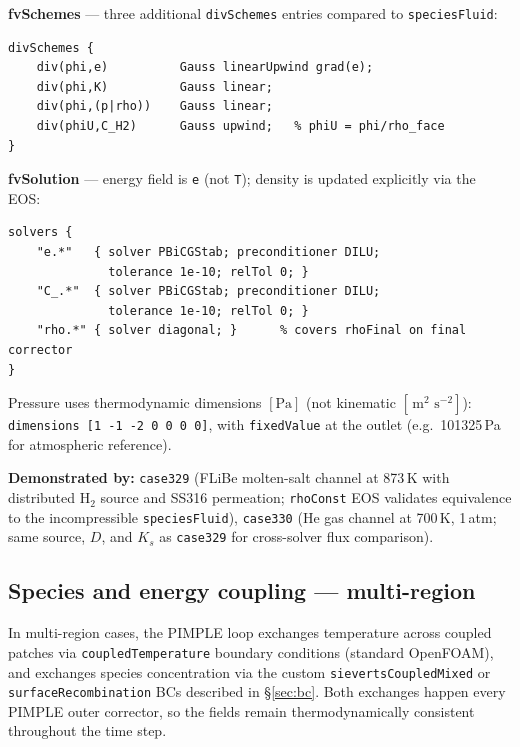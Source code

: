 \documentclass[11pt,a4paper]{article}
\newcommand{\m}{\,\text{m}}
\newcommand{\s}{\,\text{s}}
\newcommand{\caseref}[1]{\texttt{\color{casegreen}#1}}
\newcommand{\bctype}[1]{\texttt{\color{foamblue}#1}}
\begin{document}
\textbf{fvSchemes} — three additional \texttt{divSchemes} entries compared to
\texttt{speciesFluid}:
\begin{verbatim}
divSchemes {
    div(phi,e)          Gauss linearUpwind grad(e);
    div(phi,K)          Gauss linear;
    div(phi,(p|rho))    Gauss linear;
    div(phiU,C_H2)      Gauss upwind;   % phiU = phi/rho_face
}
\end{verbatim}

\textbf{fvSolution} — energy field is \texttt{e} (not \texttt{T}); density is
updated explicitly via the EOS:
\begin{verbatim}
solvers {
    "e.*"   { solver PBiCGStab; preconditioner DILU;
              tolerance 1e-10; relTol 0; }
    "C_.*"  { solver PBiCGStab; preconditioner DILU;
              tolerance 1e-10; relTol 0; }
    "rho.*" { solver diagonal; }      % covers rhoFinal on final corrector
}
\end{verbatim}

Pressure uses thermodynamic dimensions $[\text{Pa}]$ (not kinematic
$[\m^2\,\s^{-2}]$): \texttt{dimensions [1 -1 -2 0 0 0 0]}, with
\texttt{fixedValue} at the outlet (e.g.\ 101325\,Pa for atmospheric reference).

\begin{tcolorbox}[casebox]
  \textbf{Demonstrated by:}
  \caseref{case329} (FLiBe molten-salt channel at 873\,K with distributed
  H$_2$ source and SS316 permeation; \texttt{rhoConst} EOS validates
  equivalence to the incompressible \texttt{speciesFluid}),
  \caseref{case330} (He gas channel at 700\,K, 1\,atm; same source, $D$,
  and $K_s$ as \caseref{case329} for cross-solver flux comparison).
\end{tcolorbox}

\subsection{Species and energy coupling — multi-region}
\label{sec:coupling}

In multi-region cases, the PIMPLE loop exchanges temperature across coupled
patches via \bctype{coupledTemperature} boundary conditions (standard
OpenFOAM), and exchanges species concentration via the custom
\bctype{sievertsCoupledMixed} or \bctype{surfaceRecombination} BCs described
in §\ref{sec:bc}.  Both exchanges happen every PIMPLE outer corrector, so the
fields remain thermodynamically consistent throughout the time step.

\end{document}
